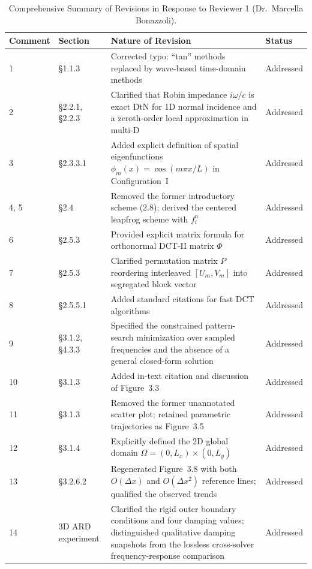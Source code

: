 \documentclass[11pt,a4paper]{article}
\begin{document}
\begin{table}[ht]
\centering
\small
\caption{Comprehensive Summary of Revisions in Response to Reviewer 1 (Dr.~Marcella Bonazzoli).}
\vspace{2mm}
\begin{tabular}{@{}llp{8.0cm}l@{}}
\toprule
\textbf{Comment} & \textbf{Section} & \textbf{Nature of Revision} & \textbf{Status} \\
\midrule
1 & \S1.1.3 & Corrected typo: ``tan'' methods replaced by wave-based time-domain methods & Addressed \\
2 & \S2.2.1, \S2.2.3 & Clarified that Robin impedance $i\omega/c$ is exact DtN for 1D normal incidence and a zeroth-order local approximation in multi-D \citep{dolean_introduction_2015} & Addressed \\
3 & \S2.3.3.1 & Added explicit definition of spatial eigenfunctions $\phi_m(x) = \cos(m\pi x/L)$ in Configuration~I & Addressed \\
4, 5 & \S2.4 & Removed the former introductory scheme (2.8); derived the centered leapfrog scheme with $f_i^n$ & Addressed \\
6 & \S2.5.3 & Provided explicit matrix formula for orthonormal DCT-II matrix $\Phi$ & Addressed \\
7 & \S2.5.3 & Clarified permutation matrix $P$ reordering interleaved $[U_m, V_m]$ into segregated block vector & Addressed \\
8 & \S2.5.5.1 & Added standard citations for fast DCT algorithms \citep{makhoul_fast_1980,rao_discrete_1990,frigo_design_2005} & Addressed \\
9 & \S3.1.2, \S4.3.3 & Specified the constrained pattern-search minimization over sampled frequencies and the absence of a general closed-form solution & Addressed \\
10 & \S3.1.3 & Added in-text citation and discussion of Figure~3.3 & Addressed \\
11 & \S3.1.3 & Removed the former unannotated scatter plot; retained parametric trajectories as Figure~3.5 & Addressed \\
12 & \S3.1.4 & Explicitly defined the 2D global domain $\Omega = (0, L_x) \times (0, L_y)$ & Addressed \\
13 & \S3.2.6.2 & Regenerated Figure~3.8 with both $O(\Delta x)$ and $O(\Delta x^2)$ reference lines; qualified the observed trends & Addressed \\
14 & 3D ARD experiment & Clarified the rigid outer boundary conditions and four damping values; distinguished qualitative damping snapshots from the lossless cross-solver frequency-response comparison & Addressed \\

\end{tabular}
\end{table}
\end{document}
